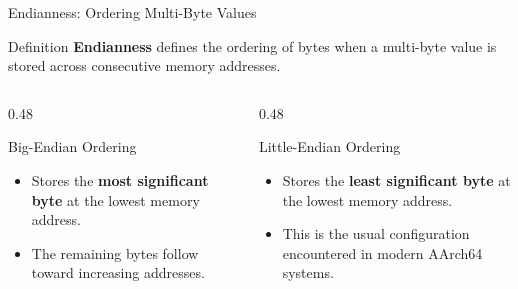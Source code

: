 \documentclass[aspectratio=169,11pt,t]{beamer}
\newcommand{\key}[1]{\textbf{#1}}
\begin{document}
\begin{frame}{Endianness: Ordering Multi-Byte Values}
\begin{block}{Definition}
\key{Endianness} defines the ordering of bytes when a multi-byte value is stored across consecutive memory addresses.
\end{block}
\vspace{0.3em}
\begin{columns}[T]
\begin{column}{0.48\textwidth}
\begin{block}{Big-Endian Ordering}
\begin{itemize}
\item Stores the \key{most significant byte} at the lowest memory address.
\item The remaining bytes follow toward increasing addresses.
\end{itemize}
\end{block}
\end{column}
\begin{column}{0.48\textwidth}
\begin{block}{Little-Endian Ordering}
\begin{itemize}
\item Stores the \key{least significant byte} at the lowest memory address.
\item This is the usual configuration encountered in modern AArch64 systems.
\end{itemize}
\end{block}
\end{column}
\end{columns}
\end{frame}





\end{document}
